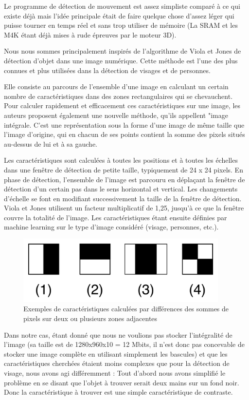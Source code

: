 \documentclass[10pt,a4paper]{report}
\begin{document}
Le programme de détection de mouvement est assez simpliste comparé à ce qui existe déjà mais l'idée principale était de faire quelque chose d'assez léger qui puisse tourner en temps réel et sans trop utiliser de mémoire (La SRAM et les M4K étant déjà mises à rude épreuves par le moteur 3D). 

Nous nous sommes principalement inspirés de l'algorithme de Viola et Jones de détection d'objet dans une image numérique. Cette méthode est l'une des plus connues et plus utilisées dans la détection de visages et de personnes. 

Elle consiste au parcours de l'ensemble d'une image en calculant un certain nombre de caractéristiques dans des zones rectangulaires qui se chevauchent. Pour calculer rapidement et efficacement ces caractéristiques sur une image, les auteurs proposent également une nouvelle méthode, qu'ils appellent "image intégrale. C'est une représentation sous la forme d'une image de même taille que l'image d'origine, qui en chacun de ses points contient la somme des pixels situés au-dessus de lui et à sa gauche.

Les caractéristiques sont calculées à toutes les positions et à toutes les échelles dans une fenêtre de détection de petite taille, typiquement de 24 x 24 pixels. En phase de détection, l'ensemble de l'image est parcouru en déplaçant la fenêtre de détection d'un certain pas dans le sens horizontal et vertical. Les changements d'échelle se font en modifiant successivement la taille de la fenêtre de détection. Viola et Jones utilisent un facteur multiplicatif de 1,25, jusqu'à ce que la fenêtre couvre la totalité de l'image. Les caractéristiques étant ensuite définies par machine learning sur le type d'image considéré (visage, personnes, etc.).

\begin{figure}[!h]
\centering
\includegraphics[width=300pt]{gfx/caract_VJ.png}
\caption{Exemples de caractéristiques calculées par différences des sommes de pixels sur deux ou plusieurs zones adjacentes}
\end{figure}

Dans notre cas, étant donné que nous ne voulions pas stocker l'intégralité de l'image (sa taille est de 1280x960x10 = 12 Mbits, il n'est donc pas concevable de stocker une image complète en utilisant simplement les bascules) et que les caractéristiques cherchées étaient moins complexes que pour la détection de visage, nous avons agi différemment : Tout d'abord nous avons simplifié le problème en se disant que l'objet à trouver serait deux mains sur un fond noir. Donc la caractéristique à trouver est une simple caractéristique de contraste. 
\end{document}

